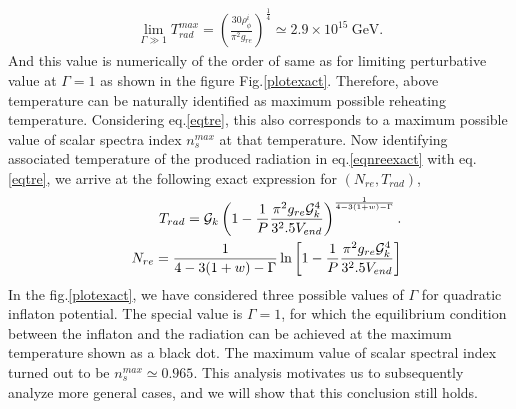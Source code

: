\documentclass[prl,twocolumn,superscriptaddress,doublespace]{revtex4}%
\def\bea{\begin{eqnarray}}
\def\eea{\end{eqnarray}}
\begin{document}
\bea
\lim_{\Gamma\gg 1} T_{rad}^{max} =    \left(\frac{30 \rho^i_{\phi}}{\pi^2 g_{re}}\right)^{\frac 1 4} \simeq 2.9 \times 10^{15}~\mbox{GeV}.
\eea
And this value is numerically of the order of same as for limiting perturbative value at $\Gamma=1$ as shown in the figure Fig.\ref{plotexact}.
Therefore, above temperature can be naturally identified as maximum possible reheating temperature. Considering eq.\ref{eqtre}, this also corresponds to a maximum possible value of scalar spectra index $n_s^{max}$ at that temperature. Now identifying associated temperature of the produced radiation in eq.\ref{eqnreexact} with eq.\ref{eqtre}, we arrive at the following exact expression for $(N_{re},T_{rad})$,
\begin{eqnarray} \label{nretre}
&& T_{rad} = {\cal G}_k\left(1-\frac{1}{P}\frac{\pi^2g_{re} {\cal G}_k^4}{3^2.5V_{end}}\right)^{\frac {1}{4-3(1+w)-\Gamma}} . \\
&& N_{re} = \frac {1}{4-3(1+w)-\Gamma}\ln \left[1-\frac {1}{P}\frac{\pi^2g_{re} {\cal G}_k^4}{3^2.5V_{end} }\right]
\label{nretre}
\end{eqnarray}
In the fig.\ref{plotexact}, we have considered three possible values of $\Gamma$ for quadratic inflaton potential. The special value is $\Gamma=1$, for which the equilibrium condition between the inflaton and the radiation can be achieved at the maximum temperature shown as a black dot.
The maximum value of scalar spectral index turned out to be $n_s^{max}\simeq 0.965$. 
This analysis motivates us to subsequently analyze more general cases, and we will show that this conclusion still holds.  
\end{document}
